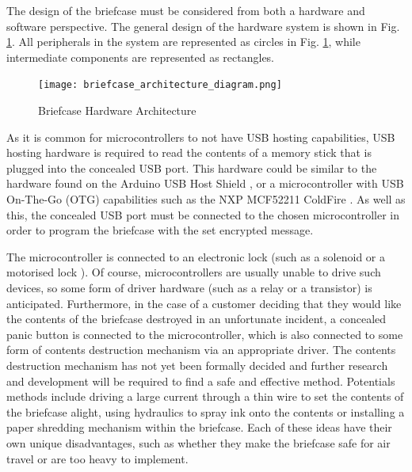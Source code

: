 The design of the briefcase must be considered from both a hardware and software perspective. The general design of the hardware system is shown in Fig. \ref{fig:briefcase_architecture}. All peripherals in the system are represented as circles in Fig. \ref{fig:briefcase_architecture}, while intermediate components are represented as rectangles.
\begin{figure}[h]
    \centering
    \texttt{[image: briefcase\_architecture\_diagram.png]}
    \caption{Briefcase Hardware Architecture}
    \label{fig:briefcase_architecture}
\end{figure}

As it is common for microcontrollers to not have USB hosting capabilities, USB hosting hardware is required to read the contents of a memory stick that is plugged into the concealed USB port. This hardware could be similar to the hardware found on the Arduino USB Host Shield \cite{arduinoUSBHost}, or a microcontroller with USB On-The-Go (OTG) capabilities \cite{techopediaUSBOTG} such as the NXP MCF52211 ColdFire \cite{nxpDatasheet}. As well as this, the concealed USB port must be connected to the chosen microcontroller in order to program the briefcase with the set encrypted message.

The microcontroller is connected to an electronic lock (such as a solenoid \cite{solenoidDigikey} or a motorised lock \cite{motorisedLock}). Of course, microcontrollers are usually unable to drive such devices, so some form of driver hardware (such as a relay or a transistor) is anticipated. Furthermore, in the case of a customer deciding that they would like the contents of the briefcase destroyed in an unfortunate incident, a concealed panic button is connected to the microcontroller, which is also connected to some form of contents destruction mechanism via an appropriate driver. The contents destruction mechanism has not yet been formally decided and further research and development will be required to find a safe and effective method. Potentials methods include driving a large current through a thin wire to set the contents of the briefcase alight, using hydraulics to spray ink onto the contents or installing a paper shredding mechanism within the briefcase. Each of these ideas have their own unique disadvantages, such as whether they make the briefcase safe for air travel or are too heavy to implement.

